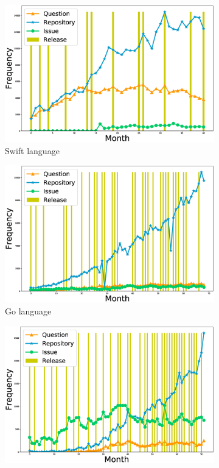 \begin{figure}[h]
 \centering
\begin{subfigure}{0.6\textwidth}
\hspace{40pt}
\includegraphics[scale=0.14]{figures/Swift_release_and_user_behaviour} 
\caption{Swift language}
\label{fig:Question count for Swift}
\end{subfigure}
\begin{subfigure}{0.6\textwidth}
\hspace{40pt}
\includegraphics[scale=0.14]{figures/Go_release_and_user_behaviour}
\caption{Go language}
\label{fig:Question count for Go}
\end{subfigure}
\begin{subfigure}{0.6\textwidth}
\hspace{40pt}
\includegraphics[scale=0.14]{figures/Rust_release_and_user_behaviour}

\end{subfigure}
\end{figure}

